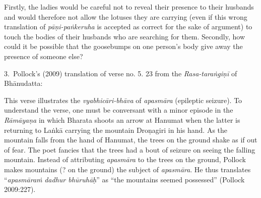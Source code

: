 Firstly, the ladies would be careful not to reveal their presence to their husbands and would therefore not allow the lotuses they are carrying (even if this wrong translation of \textsl{pāṇi-paṅkeruha} is accepted as correct for the sake of argument) to touch the bodies of their husbands who are searching for them. Secondly, how could it be possible that the goosebumps on one person's body give away the presence of someone else? 

3.~Pollock’s (2009) translation of verse no. 5. 23 from the \textsl{Rasa-taraṅgiṇī} of Bhānudatta: 

This verse illustrates the \textsl{vyabhicāri-bhāva} of \textsl{apasmāra} (epileptic seizure). To understand the verse, one must be conversant with a minor episode in the \textsl{Rāmāyaṇa} in which Bharata shoots an arrow at Hanumat when the latter is returning to Laṅkā carrying the mountain Droṇagiri in his hand. As the mountain falls from the hand of Hanumat, the trees on the ground shake as if out of fear. The poet fancies that the trees had a bout of seizure on seeing the falling mountain. Instead of attributing \textsl{apasmāra} to the trees on the ground, Pollock makes mountains (? on the ground) the subject of \textsl{apasmāra}. He thus translates “\textsl{apasmāraṁ} \textsl{dadhur bhūruhāḥ}” as “the mountains seemed possessed” (Pollock 2009:227). 

